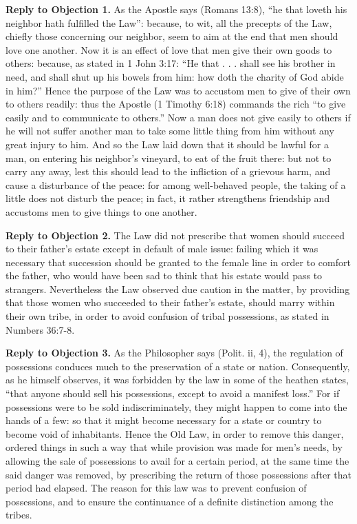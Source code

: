 \textbf{Reply to Objection 1.} As the Apostle says (Romans 13:8), ``he that loveth his neighbor hath fulfilled the Law'': because, to wit, all the precepts of the Law, chiefly those concerning our neighbor, seem to aim at the end that men should love one another. Now it is an effect of love that men give their own goods to others: because, as stated in 1 John 3:17: ``He that . . . shall see his brother in need, and shall shut up his bowels from him: how doth the charity of God abide in him?'' Hence the purpose of the Law was to accustom men to give of their own to others readily: thus the Apostle (1 Timothy 6:18) commands the rich ``to give easily and to communicate to others.'' Now a man does not give easily to others if he will not suffer another man to take some little thing from him without any great injury to him. And so the Law laid down that it should be lawful for a man, on entering his neighbor's vineyard, to eat of the fruit there: but not to carry any away, lest this should lead to the infliction of a grievous harm, and cause a disturbance of the peace: for among well-behaved people, the taking of a little does not disturb the peace; in fact, it rather strengthens friendship and accustoms men to give things to one another.

\textbf{Reply to Objection 2.} The Law did not prescribe that women should succeed to their father's estate except in default of male issue: failing which it was necessary that succession should be granted to the female line in order to comfort the father, who would have been sad to think that his estate would pass to strangers. Nevertheless the Law observed due caution in the matter, by providing that those women who succeeded to their father's estate, should marry within their own tribe, in order to avoid confusion of tribal possessions, as stated in Numbers 36:7-8.

\textbf{Reply to Objection 3.} As the Philosopher says (Polit. ii, 4), the regulation of possessions conduces much to the preservation of a state or nation. Consequently, as he himself observes, it was forbidden by the law in some of the heathen states, ``that anyone should sell his possessions, except to avoid a manifest loss.'' For if possessions were to be sold indiscriminately, they might happen to come into the hands of a few: so that it might become necessary for a state or country to become void of inhabitants. Hence the Old Law, in order to remove this danger, ordered things in such a way that while provision was made for men's needs, by allowing the sale of possessions to avail for a certain period, at the same time the said danger was removed, by prescribing the return of those possessions after that period had elapsed. The reason for this law was to prevent confusion of possessions, and to ensure the continuance of a definite distinction among the tribes.

